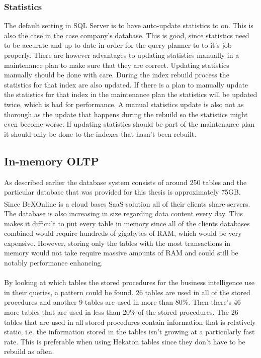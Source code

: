 \documentclass{cslthse-msc}
\newcommand{\bex}{BeX\textsuperscript{\textregistered}}
\begin{document}
\subsubsection{Statistics}
The default setting in SQL Server is to have auto-update statistics to on. This is also the case in the case company's database. This is good, since statistics need to be accurate and up to date in order for the query planner to to it's job properly. There are however advantages to updating statistics manually in a maintenance plan to make sure that they are correct. Updating statistics manually should be done with care. During the index rebuild process the statistics for that index are also updated. If there is a plan to manually update the statistics for that index in the maintenance plan the statistics will be updated twice, which is bad for performance. A manual statistics update is also not as thorough as the update that happens during the rebuild so the statistics might even become worse. If updating statistics should be part of the maintenance plan it should only be done to the indexes that hasn't been rebuilt.

\subsection{In-memory OLTP}
As described earlier the database system consists of around 250 tables and the particular database that was provided for this thesis is approximately 75GB. Since \bex Online is a cloud bases SaaS solution all of their clients share servers. The database is also increasing in size regarding data content every day. This makes it difficult to put every table in memory since all of the clients databases combined would require hundreds of gigabytes of RAM, which would be very expensive. However, storing only the tables with the most transactions in memory would not take require massive amounts of RAM and could still be notably performance enhancing.
\\\\
By looking at which tables the stored procedures for the business intelligence use in their queries, a pattern could be found. 26 tables are used in all of the stored procedures and another 9 tables are used in more than 80\%. Then there's 46 more tables that are used in less than 20\% of the stored procedures. The 26 tables that are used in all stored procedures contain information that is relatively static, i.e. the information stored in the tables isn't growing at a particularly fast rate. This is preferable when using Hekaton tables since they don't have to be rebuild as often.
\end{document}
